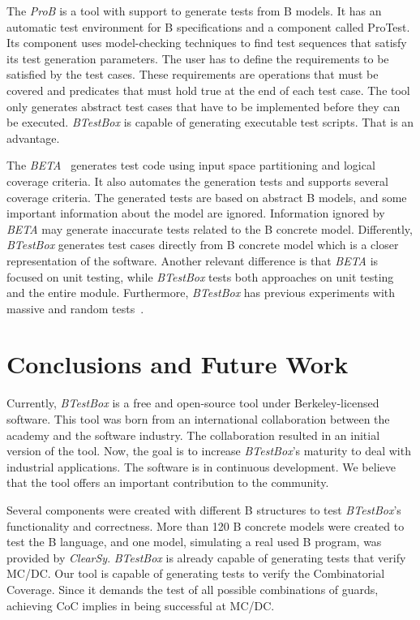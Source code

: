 \documentclass[runningheads]{llncs}
\begin{document}
The \textit{ProB} is a tool with support to generate tests from B models. It has an automatic test environment for B specifications and a component called ProTest.
Its component uses model-checking techniques to find test sequences that satisfy its test generation parameters. The user has to define the requirements to be satisfied by the test cases. These requirements are operations that must be covered and predicates that must hold true at the end of each test case. The tool only generates abstract test cases that have to be implemented before they can be executed. \textit{BTestBox} is capable of generating executable test scripts. That is an advantage. 


The \textit{BETA}~\cite{ernesto_thesis:2016} generates test code using input space partitioning and logical coverage criteria. It also automates the generation tests and supports several coverage criteria. The generated tests are based on abstract B models, and some important information about the model are ignored.
Information ignored by \textit{BETA} may generate inaccurate tests related to the B concrete model. Differently, \textit{BTestBox} generates test cases directly from B concrete model which is a closer representation of the software.
Another relevant difference is that \textit{BETA} is focused on unit testing, while \textit{BTestBox} tests both approaches on unit testing and the entire module. Furthermore, \textit{BTestBox} has previous experiments with massive and random tests~\cite{deharbebtestbox}.

\section{Conclusions and Future Work} \label{sec:Conclusion}


Currently, \textit{BTestBox} is a free and open-source tool under Berkeley-licensed software.
This tool was born from an international collaboration between the academy and the software industry. The collaboration resulted in an initial version of the tool. Now, the goal is to increase \textit{BTestBox}'s maturity to deal with industrial applications.
The software is in continuous development.
We believe that the tool offers an important contribution to the community.

Several components were created with different B structures to test \textit{BTestBox}'s functionality and correctness. More than 120 B concrete models were created to test the B language, and one model, simulating a real used B program, was provided by \textit{ClearSy}. \textit{BTestBox} is already capable of generating tests that verify MC/DC. Our tool is capable of generating tests to verify the Combinatorial Coverage. Since it demands the test of all possible combinations of guards, achieving CoC implies in being successful at MC/DC. %
\end{document}
